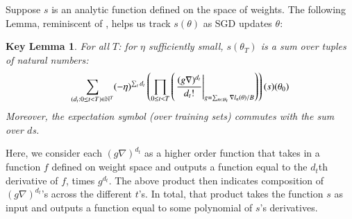 \documentclass[anon,12pt]{colt2021} %
\newtheorem*{klem*}{Key Lemma}
\newcommand{\wrap}[1]{\left(#1\right)}
\newcommand{\Bb}{\mathcal{B}}
\begin{document}
        Suppose $s$ is an analytic function defined on the space of weights.
        The following Lemma, reminiscent of \cite{dy49a}, helps us track
        $s(\theta)$ as SGD updates $\theta$:
        \begin{klem*} \label{lem:dyson}
            For all $T$: for $\eta$ sufficiently small, $s(\theta_T)$ is a sum
            over tuples of natural numbers:
            \begin{equation}\label{eq:dyson2}
                \sum_{(d_t: 0\leq t<T) \in \NN^T}
                (-\eta)^{\sum_t d_t}
                \wrap{
                    \prod_{0 \leq t < T}
                        \wrap{\left.
                            \frac{(g \nabla)^{d_t}}{d_t!}
                        \right|_{g = \sum_{n\in \Bb_t} \nabla l_n(\theta) / B}}
                }(s) (\theta_0)
            \end{equation}
            Moreover, the expectation symbol (over training sets) commutes with
            the sum over $d$s.
        \end{klem*}
        Here, we consider each $(g \nabla)^{d_t}$ as a higher order function
        that takes in a function $f$ defined on weight space and outputs a
        function equal to the $d_t$th derivative of $f$, times $g^{d_t}$.
        The above product then indicates composition of $(g \nabla)^{d_t}$'s
        across the different $t$'s.  In total, that product takes the function
        $s$ as input and outputs a function equal to some polynomial of $s$'s
        derivatives.
\end{document}

